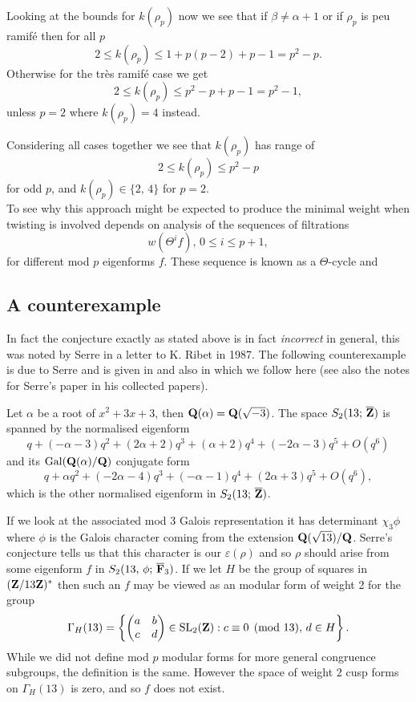 \documentclass[a4paper,12pt]{article}
\begin{document}

Looking at the bounds for $k(\rho_p)$ now we see that if $\beta \ne \alpha + 1$ or if $\rho_p$ is peu ramif\'e then for all $p$
\[
2\le k(\rho_p) \le 1 + p(p-2) + p - 1 = p^2 - p.
\]
Otherwise for the tr\`es ramif\'e case we get
\[
2\le k(\rho_p) \le p^2 - p + p -1 = p^2 - 1,
\]
unless $p =2$ where $k(\rho_p) = 4$ instead.

Considering all cases together we see that $k(\rho_p)$ has range of
\[
2\le k(\rho_p) \le p^2 - p
\]
for odd $p$, and $k(\rho_p) \in\{2,\,4\}$ for $p=2$.
\\[12pt] \noindent
To see why this approach might be expected to produce the minimal weight when twisting is involved depends on analysis of the sequences of filtrations
\[
w(\Theta^i f),\, 0 \le i \le p + 1,
\]
for different mod $p$ eigenforms $f$.
These sequence is known as a $\Theta$-cycle and 


\subsection{A counterexample}\label{subsec:counter}
In fact the conjecture exactly as stated above is in fact \emph{incorrect} in general, this was noted by Serre in a letter to K. Ribet in 1987.
The following counterexample is due to Serre and is given in \cite[sec. 2]{Ribet95} and also in \cite[sec. 21.6.1]{RibetSteinBook} which we follow here (see also the notes for Serre's paper in his collected papers).

\begin{ex}
Let $\alpha$ be a root of $x^2 + 3x+ 3$, then $\mathbf{Q}(\alpha) = \mathbf{Q} (\sqrt{-3})$.
The space $S_2(13;\,\overline{\mathbf{Z}})$ is spanned by the normalised eigenform
\[
q + (-\alpha - 3)q^{2} + (2 \alpha + 2)q^{3} + (\alpha + 2)q^{4} + (-2 \alpha - 3)q^{5} + O(q^{6})
\]
and its $\operatorname{Gal}(\mathbf{Q}(\alpha)/\mathbf{Q})$ conjugate form
\[
q + \alpha q^{2} + (-2 \alpha - 4)q^{3} + (-\alpha - 1)q^{4} + (2 \alpha + 3)q^{5} + O(q^{6}),
\]
which is the other normalised eigenform in $S_2(13;\,\overline{\mathbf{Z}})$.

If we look at the associated mod 3 Galois representation it has determinant $\chi_3 \phi$ where $\phi$ is the Galois character coming from the extension $\mathbf{Q}(\sqrt{13})/\mathbf{Q}$.
Serre's conjecture tells us that this character is our $\varepsilon(\rho)$ and so $\rho$ should arise from some eigenform $f$ in $S_2(13,\,\phi;\,\overline{\mathbf{F}}_3)$.
If we let $H$ be the group of squares in $(\mathbf{Z}/13\mathbf{Z})^*$ then such an $f$ may be viewed as an modular form of weight 2 for the group
\[
\Gamma_H(13) = \left\{ \begin{pmatrix} a & b\\ c & d\\ \end{pmatrix} \in \operatorname{SL}_2(\mathbf{Z}) : c \equiv 0 \pmod{13},\,d \in H\right\}.
\]
While we did not define mod $p$ modular forms for more general congruence subgroups, the definition is the same.
However the space of weight 2 cusp forms on $\Gamma_H(13)$ is zero, and so $f$ does not exist. %
\end{ex}
\end{document}
